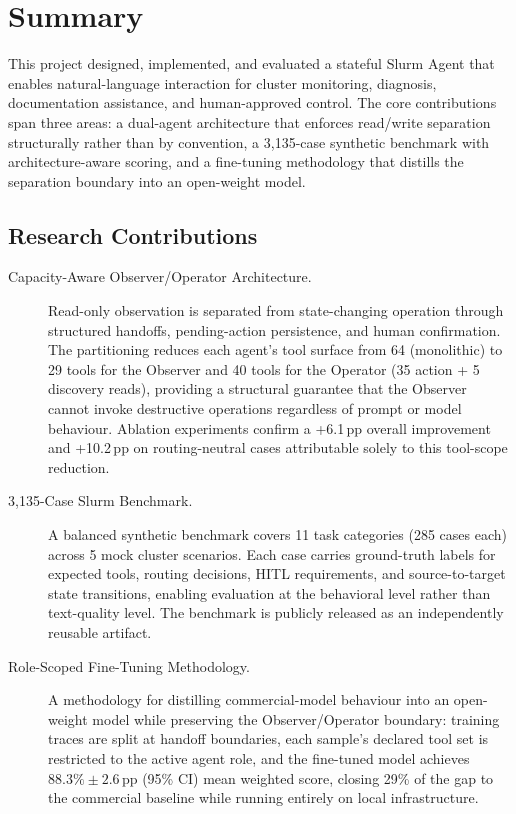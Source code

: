 \section{Summary}
\label{sec:summary}

This project designed, implemented, and evaluated a stateful Slurm Agent that enables natural-language interaction for cluster monitoring, diagnosis, documentation assistance, and human-approved control. The core contributions span three areas: a dual-agent architecture that enforces read/write separation structurally rather than by convention, a 3,135-case synthetic benchmark with architecture-aware scoring, and a fine-tuning methodology that distills the separation boundary into an open-weight model.

\subsection{Research Contributions}

\begin{description}
    \item[Capacity-Aware Observer/Operator Architecture.] Read-only observation is separated from state-changing operation through structured handoffs, pending-action persistence, and human confirmation. The partitioning reduces each agent's tool surface from 64 (monolithic) to 29 tools for the Observer and 40 tools for the Operator (35 action + 5 discovery reads), providing a structural guarantee that the Observer cannot invoke destructive operations regardless of prompt or model behaviour. Ablation experiments confirm a +6.1\,pp overall improvement and +10.2\,pp on routing-neutral cases attributable solely to this tool-scope reduction.

    \item[3,135-Case Slurm Benchmark.] A balanced synthetic benchmark covers 11 task categories (285 cases each) across 5 mock cluster scenarios. Each case carries ground-truth labels for expected tools, routing decisions, HITL requirements, and source-to-target state transitions, enabling evaluation at the behavioral level rather than text-quality level. The benchmark is publicly released as an independently reusable artifact.

    \item[Role-Scoped Fine-Tuning Methodology.] A methodology for distilling commercial-model behaviour into an open-weight model while preserving the Observer/Operator boundary: training traces are split at handoff boundaries, each sample's declared tool set is restricted to the active agent role, and the fine-tuned model achieves $88.3\% \pm 2.6$\,pp (95\% CI) mean weighted score, closing 29\% of the gap to the commercial baseline while running entirely on local infrastructure.
\end{description}

